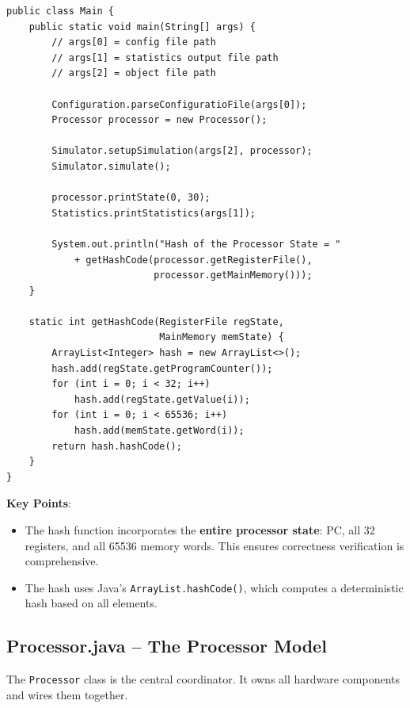 \documentclass[12pt,a4paper]{article}
\begin{document}
\begin{lstlisting}[style=javastyle, caption={Main.java}]
public class Main {
    public static void main(String[] args) {
        // args[0] = config file path
        // args[1] = statistics output file path
        // args[2] = object file path

        Configuration.parseConfiguratioFile(args[0]);
        Processor processor = new Processor();

        Simulator.setupSimulation(args[2], processor);
        Simulator.simulate();

        processor.printState(0, 30);
        Statistics.printStatistics(args[1]);

        System.out.println("Hash of the Processor State = "
            + getHashCode(processor.getRegisterFile(),
                          processor.getMainMemory()));
    }

    static int getHashCode(RegisterFile regState,
                           MainMemory memState) {
        ArrayList<Integer> hash = new ArrayList<>();
        hash.add(regState.getProgramCounter());
        for (int i = 0; i < 32; i++)
            hash.add(regState.getValue(i));
        for (int i = 0; i < 65536; i++)
            hash.add(memState.getWord(i));
        return hash.hashCode();
    }
}
\end{lstlisting}

\textbf{Key Points}:
\begin{itemize}
    \item The hash function incorporates the \textbf{entire processor state}: PC, all 32 registers, and all 65536 memory words. This ensures correctness verification is comprehensive.
    \item The hash uses Java's \texttt{ArrayList.hashCode()}, which computes a deterministic hash based on all elements.
\end{itemize}

\subsection{Processor.java -- The Processor Model}

The \texttt{Processor} class is the central coordinator. It owns all hardware components and wires them together.
\end{document}
